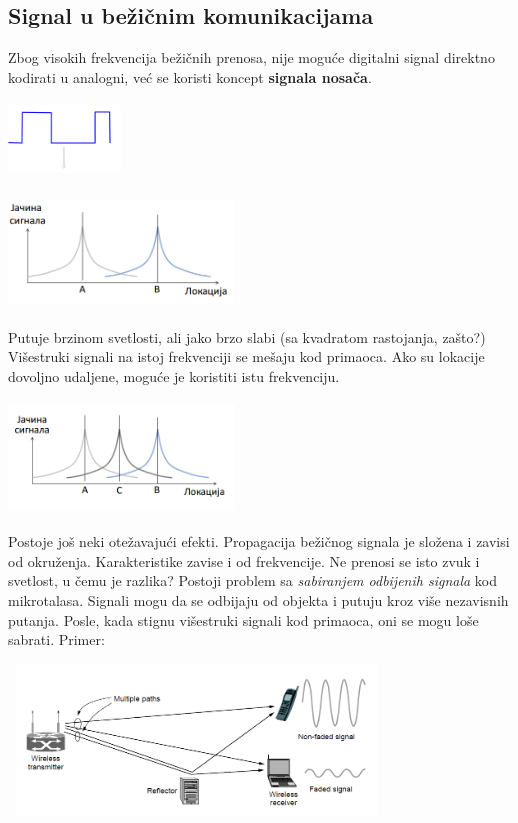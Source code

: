 \documentclass{article} %
\begin{document}
\subsection{Signal u bežičnim komunikacijama}
Zbog visokih frekvencija bežičnih prenosa, nije moguće digitalni signal direktno kodirati u analogni, već se koristi koncept \textbf{signala nosača}.
\begin{center}
\includegraphics[width=3cm, height=2cm]{signal}\\
\end{center}
\begin{center}
\includegraphics[width=6cm, height=3cm]{signal2}\\
\end{center}
Putuje brzinom svetlosti, ali jako brzo slabi (sa kvadratom rastojanja, zašto?)\\

Višestruki signali na istoj frekvenciji se mešaju kod primaoca. Ako su lokacije dovoljno udaljene, moguće je koristiti istu frekvenciju.
\begin{center}
\includegraphics[width=6cm, height=3cm]{signal3}\\
\end{center}
Postoje još neki otežavajući efekti. Propagacija bežičnog signala je složena i zavisi od okruženja. Karakteristike zavise i od frekvencije. Ne prenosi se isto zvuk i svetlost, u čemu je razlika? Postoji problem sa \textit{sabiranjem odbijenih signala} kod mikrotalasa. Signali mogu da se odbijaju od objekta i putuju kroz više nezavisnih putanja. Posle, kada stignu višestruki signali kod primaoca, oni se mogu loše sabrati.  Primer:
\begin{center}
\includegraphics[width=10cm, height=4cm]{signal4}\\
\end{center}
\end{document}
